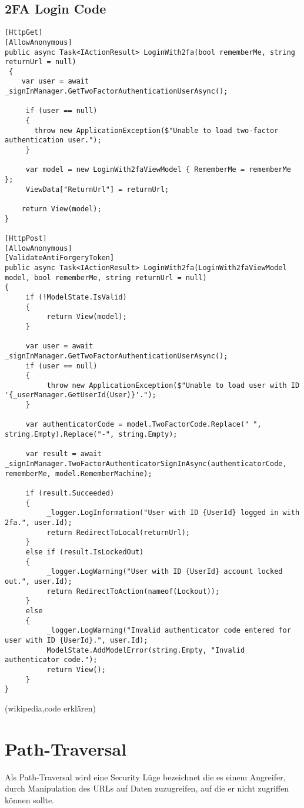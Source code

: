\subsection{2FA Login Code}
\label{sec:2FALogin}
\begin{lstlisting}
[HttpGet]
[AllowAnonymous]
public async Task<IActionResult> LoginWith2fa(bool rememberMe, string returnUrl = null)
 {
    var user = await _signInManager.GetTwoFactorAuthenticationUserAsync();

     if (user == null)
     {
       throw new ApplicationException($"Unable to load two-factor authentication user.");
     }

     var model = new LoginWith2faViewModel { RememberMe = rememberMe };
     ViewData["ReturnUrl"] = returnUrl;

    return View(model);
}

[HttpPost]
[AllowAnonymous]
[ValidateAntiForgeryToken]
public async Task<IActionResult> LoginWith2fa(LoginWith2faViewModel model, bool rememberMe, string returnUrl = null)
{
     if (!ModelState.IsValid)
     {
          return View(model);
     }

     var user = await _signInManager.GetTwoFactorAuthenticationUserAsync();
     if (user == null)
     {
          throw new ApplicationException($"Unable to load user with ID '{_userManager.GetUserId(User)}'.");
     }

     var authenticatorCode = model.TwoFactorCode.Replace(" ", string.Empty).Replace("-", string.Empty);

     var result = await _signInManager.TwoFactorAuthenticatorSignInAsync(authenticatorCode, rememberMe, model.RememberMachine);

     if (result.Succeeded)
     {
          _logger.LogInformation("User with ID {UserId} logged in with 2fa.", user.Id);
          return RedirectToLocal(returnUrl);
     }
     else if (result.IsLockedOut)
     {
          _logger.LogWarning("User with ID {UserId} account locked out.", user.Id);
          return RedirectToAction(nameof(Lockout));
     }
     else
     {
          _logger.LogWarning("Invalid authenticator code entered for user with ID {UserId}.", user.Id);
          ModelState.AddModelError(string.Empty, "Invalid authenticator code.");
          return View();
     }
}
\end{lstlisting}
(wikipedia,code erklären)
\section{Path-Traversal}
\label{sec:Path-Traversal}
Als Path-Traversal wird eine Security Lüge bezeichnet die es einem Angreifer, durch Manipulation des URLs auf Daten zuzugreifen, auf die er nicht zugriffen können sollte. 
